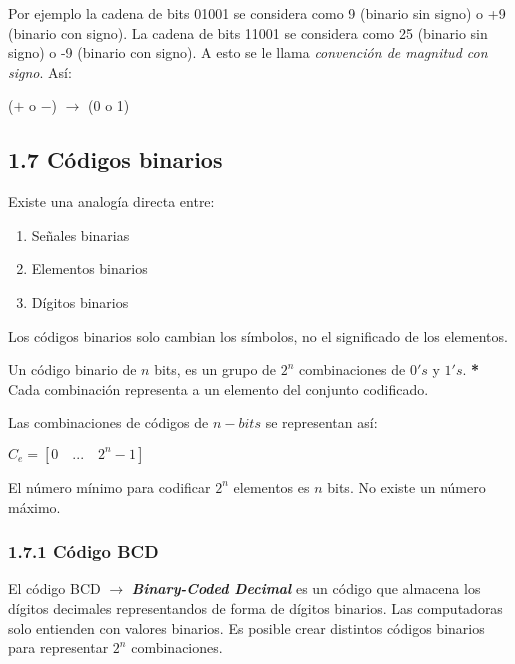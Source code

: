 Por ejemplo la cadena de bits 01001 se considera como 9 (binario sin signo) o
+9 (binario con signo). La cadena de bits 11001 se considera como 25 (binario
sin signo) o -9 (binario con signo). A esto se le llama \textit{convenci\'{o}n
de magnitud con signo}. As\'{i}: \begin{center} ($+$ o $-$) $\rightarrow$ (0 o
    1) \end{center}

\subsection*{1.7 C\'{o}digos binarios}

Existe una analog\'{i}a directa entre: \begin{enumerate} \small \item
          Se\~{n}ales binarias \item Elementos binarios \item D\'{i}gitos binarios
\end{enumerate}

Los c\'{o}digos binarios solo cambian los s\'{i}mbolos, no el significado de
los elementos. \begin{center} Un c\'{o}digo binario de $n$ bits, es un grupo de
    $2^n$ combinaciones de $0's$ y $1's$. \textbf{*} Cada combinaci\'{o}n representa
    a un elemento del conjunto codificado. \end{center}

Las combinaciones de c\'{o}digos de $n-bits$ se representan as\'{i}:
\begin{center} $ C_{e} = [0 \quad ... \quad 2^n - 1]$ \end{center}

El n\'{u}mero m\'{i}nimo para codificar $2^n$ elementos es $n$ bits. No existe
un n\'{u}mero m\'{a}ximo.

\subsubsection*{1.7.1 C\'{o}digo BCD} El c\'{o}digo BCD $\rightarrow$
\textbf{\textit{Binary-Coded Decimal}} es un c\'{o}digo que almacena los
d\'{i}gitos decimales representandos de forma de d\'{i}gitos binarios. Las
computadoras solo entienden con valores binarios. Es posible crear distintos
c\'{o}digos binarios para representar $2^n$ combinaciones.

